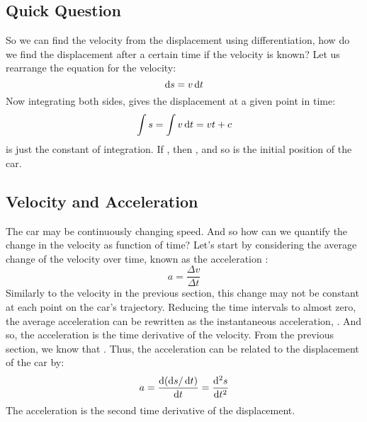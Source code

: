 \subsection*{Quick Question}
So we can find the velocity from the displacement using differentiation, how do we find the displacement after a certain time if the velocity is known? Let us rearrange the equation for the velocity:
 \begin{equation}
\operatorname{d}\! s = v \operatorname{d}\! t \label{inst_s}
\end{equation}
Now integrating both sides, gives the displacement at a given point in time:
  \begin{equation}
\int s = \int v \operatorname{d}\! t = vt + c
\end{equation}
 is just the constant of integration. If \value{t}{0}{}, then \value{s}{c}{}, and so  is the initial position of the car.

\subsection{Velocity and Acceleration}
The car may be continuously changing speed. And so how can we quantify the change in the velocity as function of time? Let's start by considering the average change of the velocity over time, known as the acceleration :
\begin{equation}
a = \frac{\Delta v}{\Delta t} 
\end{equation}
Similarly to the velocity in the previous section, this change may not be constant at each point on the car's trajectory. Reducing the time intervals to almost zero, the average acceleration can be rewritten as the instantaneous acceleration, . And so, the acceleration is the time derivative of the velocity. From the previous section, we know that . Thus, the acceleration can be related to the displacement of the car by:
\begin{equation}
a = \frac{\operatorname{d}\! \left(\operatorname{d}\! s/ \operatorname{d}\! t\right)}{\operatorname{d}\! t} = \frac{\operatorname{d}\!^2 s}{\operatorname{d}\! t^2} 
\end{equation}
 The acceleration is the second time derivative of the displacement. 
